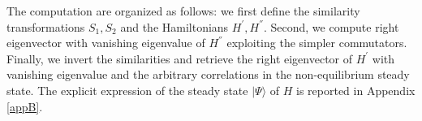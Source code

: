 \documentclass[10pt]{article}
\numberwithin{equation}{section}
\numberwithin{equation}{subsection}
\newcommand{\com}[1]{{ (* {\color{red}\small #1}*)}}
\begin{document}
The computation are organized as follows: we first define the similarity transformations $S_{1},S_{2}$ and the Hamiltonians $H^{'},H^{''}$. Second, we compute right eigenvector with vanishing eigenvalue of $H^{''}$ exploiting the simpler commutators. Finally, we invert the similarities and retrieve the right eigenvector of $H^{'}$ with vanishing eigenvalue and  the arbitrary correlations in the non-equilibrium steady state. The explicit expression of the steady state $|\Psi\rangle$ of $H$ is reported in Appendix \ref{appB}. 




\begin{comment}
{\color{blue}We aim to find an explicit for for the steady state $|\Psi\rangle$. The MPA gives the steady state in terms of an abstract algebra of operators. If an explicit representation of $(X_{a})_{a=1,\ldots,N}$ was available, it would be possible to compute explicitly all the correlations and currents of particles for the Hamiltonian \eqref{hamiltonian}. Another way of computing this steady state, without passing through a representation, is using the commutators \eqref{bula} and the actions \eqref{leftBoundary} and \eqref{rightBoundary}. For the one and two point correlation and for the currents this has been done in \cite{vanicat2017exact}. Inspired by this last reference, in this subsection, we aim to find exact formulas for the steady state  $|\Psi\rangle$ using only the \eqref{bula}, \eqref{leftBoundary} and \eqref{rightBoundary}. In subsection \ref{correlation-section}, this result will leads to exact correlation for arbitrary number of particles of type $\{2,\ldots,N\}$. This aim will be achieved by the help of a similarity transformation $\mathcal{S}$ that makes commutation relations simpler, and allows to find the steady state $|\widetilde\Psi\rangle$ of a transformed Hamiltonian, denoted  $\mathbb{H}$, with lower-triangular left boundary and diagonal right boundary. Therefore, inverting this similarity, one can retrieve the steady state of \eqref{hamiltonian}. A fundamental 'ingredient' of these computation is duality, that has been proved in section~\ref{sectionDuality}. Indeed, the similarity transformation $\mathcal{S}$ relies on an "intermediate transformation" $V$ (see \eqref{transformationV}) that is, up to the diagonal operator $R$, the duality matrix.} \com{clarify}
\end{comment}
\end{document}

